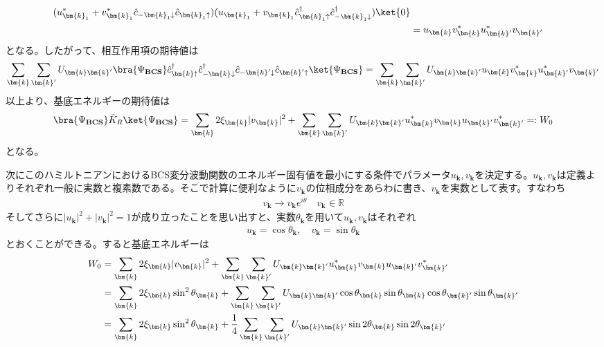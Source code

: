 \documentclass[dvipdfmx, 11pt, a4paper]{jsarticle}
\numberwithin{equation}{section}
\theoremstyle{definition}
\begin{document}
\begin{derivationBox}
\begin{align}
{            }(u_{\bm{k}_1}^* + v_{\bm{k}_1}^*\hat{c}_{-\bm{k}_1\downarrow} \hat{c}_{\bm{k}_1 \uparrow}) (u_{\bm{k}_1} + v_{\bm{k}_1} \hat{c}_{\bm{k}_1\uparrow}^\dagger\hat{c}_{-\bm{k}_1\downarrow}^\dagger) \ket{0} \notag \\
            &= u_{\bm{k}} v_{\bm{k}}^*  u_{\bm{k}'}^* v_{\bm{k}'}
        \end{align}
        となる。したがって、相互作用項の期待値は
        \begin{align}
            \sum_{\bm{k}}\sum_{\bm{k}'}U_{\bm{k}\bm{k}'} \bra{\Psi_{\textbf{BCS}}} \hat{c}_{\bm{k}\uparrow}^\dagger \hat{c}_{-\bm{k}\downarrow}^\dagger \hat{c}_{-\bm{k}'\downarrow}\hat{c}_{\bm{k}'\uparrow} \ket{\Psi_{\textbf{BCS}}} 
            = \sum_{\bm{k}}\sum_{\bm{k}'}U_{\bm{k}\bm{k}'} u_{\bm{k}} v_{\bm{k}}^*  u_{\bm{k}'}^* v_{\bm{k}'}
        \end{align}
        以上より、基底エネルギーの期待値は
        \begin{align}
            \bra{\Psi_{\textbf{BCS}}} \hat{K}_R \ket{\Psi_{\textbf{BCS}}} = \sum_{\bm{k}}2\xi_{\bm{k}} |v_{\bm{k}}|^2 + \sum_{\bm{k}}\sum_{\bm{k}'} U_{\bm{k}\bm{k}'} u_{\bm{k}}^* v_{\bm{k}} u_{\bm{k}'}v_{\bm{k}'}^* =: W_0
        \end{align}
        となる。
    \end{derivationBox}
    次にこのハミルトニアンにおけるBCS変分波動関数のエネルギー固有値を最小にする条件でパラメータ$u_{\bm{k}},v_{\bm{k}}$を決定する。$u_{\bm{k}},v_{\bm{k}}$は定義よりそれぞれ一般に実数と複素数である。そこで計算に便利なように$v_{\bm{k}}$の位相成分をあらわに書き、$v_{\bm{k}}$を実数として表す。すなわち
    \begin{align}
        v_{\bm{k}} \rightarrow v_{\bm{k}} e^{i\theta} \quad v_{\bm{k}} \in \mathbb{R}
    \end{align}
    そしてさらに$|u_{\bm{k}}|^2 + |v_{\bm{k}}|^2 = 1$が成り立ったことを思い出すと、実数$\theta_{\bm{k}}$を用いて$u_{\bm{k}},v_{\bm{k}}$はそれぞれ
    \begin{align}
        u_{\bm{k}} = \cos \theta_{\bm{k}},\quad v_{\bm{k}} = \sin \theta_{\bm{k}}
    \end{align}
    とおくことができる。すると基底エネルギーは
    \begin{align}
        W_0 &= \sum_{\bm{k}}2\xi_{\bm{k}} |v_{\bm{k}}|^2 + \sum_{\bm{k}}\sum_{\bm{k}'} U_{\bm{k}\bm{k}'} u_{\bm{k}}^* v_{\bm{k}} u_{\bm{k}'}v_{\bm{k}'}^* \notag \\
        &= \sum_{\bm{k}}2\xi_{\bm{k}} \sin ^2 \theta_{\bm{k}} + \sum_{\bm{k}}\sum_{\bm{k}'} U_{\bm{k}\bm{k}'} \cos \theta_{\bm{k}} \sin \theta_{\bm{k}} \cos \theta_{\bm{k}'} \sin \theta_{\bm{k}'} \notag \\
        &= \sum_{\bm{k}}2\xi_{\bm{k}} \sin ^2 \theta_{\bm{k}} + \frac{1}{4} \sum_{\bm{k}}\sum_{\bm{k}'} U_{\bm{k}\bm{k}'} \sin 2\theta_{\bm{k}} \sin 2\theta_{\bm{k}'}
    \end{align}
\end{document}
